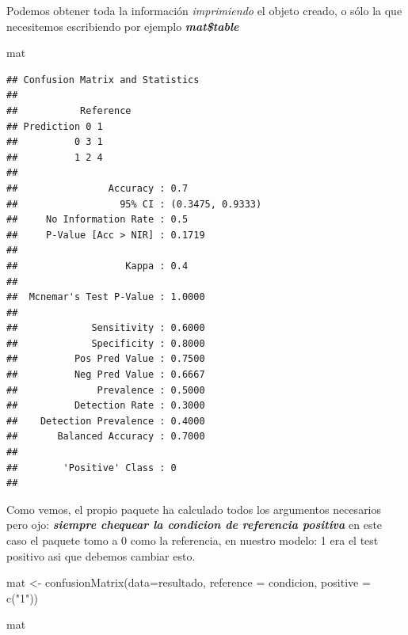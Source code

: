 \documentclass[
]{book}
\newenvironment{Shaded}{\begin{snugshade}}{\end{snugshade}}
\newcommand{\AttributeTok}[1]{\textcolor[rgb]{0.77,0.63,0.00}{#1}}
\newcommand{\FunctionTok}[1]{\textcolor[rgb]{0.00,0.00,0.00}{#1}}
\newcommand{\NormalTok}[1]{#1}
\newcommand{\OtherTok}[1]{\textcolor[rgb]{0.56,0.35,0.01}{#1}}
\newcommand{\StringTok}[1]{\textcolor[rgb]{0.31,0.60,0.02}{#1}}
\begin{document}
Podemos obtener toda la información \emph{imprimiendo} el objeto creado, o sólo la que necesitemos escribiendo por ejemplo \textbf{\emph{mat\$table}}

\begin{Shaded}
\begin{Highlighting}[]
\NormalTok{mat}
\end{Highlighting}
\end{Shaded}

\begin{verbatim}
## Confusion Matrix and Statistics
## 
##           Reference
## Prediction 0 1
##          0 3 1
##          1 2 4
##                                           
##                Accuracy : 0.7             
##                  95% CI : (0.3475, 0.9333)
##     No Information Rate : 0.5             
##     P-Value [Acc > NIR] : 0.1719          
##                                           
##                   Kappa : 0.4             
##                                           
##  Mcnemar's Test P-Value : 1.0000          
##                                           
##             Sensitivity : 0.6000          
##             Specificity : 0.8000          
##          Pos Pred Value : 0.7500          
##          Neg Pred Value : 0.6667          
##              Prevalence : 0.5000          
##          Detection Rate : 0.3000          
##    Detection Prevalence : 0.4000          
##       Balanced Accuracy : 0.7000          
##                                           
##        'Positive' Class : 0               
## 
\end{verbatim}

Como vemos, el propio paquete ha calculado todos los argumentos necesarios pero ojo: \textbf{\emph{siempre chequear la condicion de referencia positiva}} en este caso el paquete tomo a 0 como la referencia, en nuestro modelo: 1 era el test positivo asi que debemos cambiar esto.

\begin{Shaded}
\begin{Highlighting}[]
\NormalTok{mat }\OtherTok{\textless{}{-}} \FunctionTok{confusionMatrix}\NormalTok{(}\AttributeTok{data=}\NormalTok{resultado, }\AttributeTok{reference =}\NormalTok{ condicion, }\AttributeTok{positive =} \FunctionTok{c}\NormalTok{(}\StringTok{"1"}\NormalTok{))}

\NormalTok{mat}
\end{Highlighting}
\end{Shaded}
\end{document}
